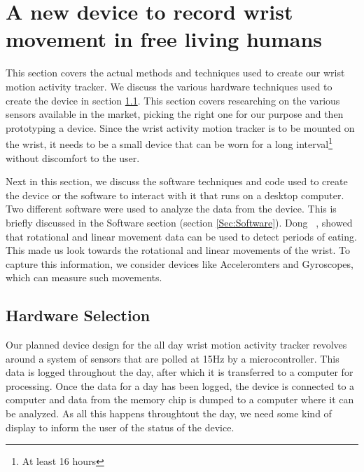 \chapter{A new device to record wrist movement in free living humans}
\label{Chap:Methods}
This section covers the actual methods and techniques used to create our wrist 
motion activity tracker. We discuss the various hardware techniques used to 
create the device in section \ref{Sec:Hardware}.
This section covers researching on the various sensors available in the market,
picking the right one for our purpose and then prototyping a device.
Since the wrist activity motion tracker is to be mounted on the wrist, it needs
to be a small device that can be worn for a long interval\footnote{At least
16 hours} without discomfort to the user.%

Next in this section, we discuss the software techniques and code
used to create the device or the software to interact with it that runs on a desktop computer.
Two different software were used to analyze the data from the device.
This is briefly discussed in the Software section (section \ref{Sec:Software}).
Dong ~\cite{dong2013detecting}, showed that rotational and linear movement data can be used to detect
periods of eating. This made us look towards the rotational and linear movements of the wrist.
To capture this information, we consider devices like Acceleromters and Gyroscopes, which can measure such movements.

\section{Hardware Selection}
\label{Sec:Hardware}
Our planned device design for the all day wrist motion activity tracker revolves around a system of sensors that are polled at 15Hz by a microcontroller. This data is logged throughout the day, after which it is transferred to a computer for processing. Once the data for a day has been logged, the device is connected to a computer and data from the memory chip is dumped to a computer where it can be analyzed. As all this happens throughtout the day, we need some kind of display to inform the user of the status of the device.

